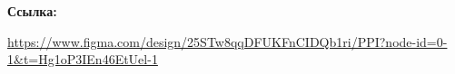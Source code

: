 \begin{minipage}{\linewidth}
\end{minipage}
\bigskip

\textbf{Ссылка:}

\url{https://www.figma.com/design/25STw8qqDFUKFnCIDQb1ri/PPI?node-id=0-1&t=Hg1oP3IEn46EtUel-1}
\bigskip
\bigskip


